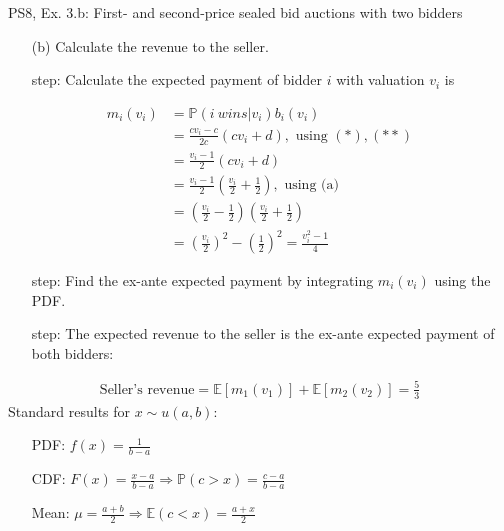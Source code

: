 \begin{frame}{PS8, Ex. 3.b: First- and second-price sealed bid auctions with two bidders}
    \begin{multicols}{2}
      \begin{itemize}
        \item[(b)] Calculate the revenue to the seller.
        \item[\nth{1} step:] Calculate the expected payment of bidder $i$ with valuation $v_i$ is
      \end{itemize}
      \vspace{-12pt}
      \begin{align*}
        m_i(v_i)&=\mathbb{P}(i\ wins|v_i)b_i(v_i)\\
                &=\frac{cv_i-c}{2c}(cv_i+d),\text{ using }(*),(**)\\
                &=\frac{v_i-1}{2}(cv_i+d)\\
                &=\frac{v_i-1}{2}\left(\frac{v_i}{2}+\frac{1}{2}\right),\text{ using (a)}\\
                &=\left(\frac{v_i}{2}-\frac{1}{2}\right)\left(\frac{v_i}{2}+\frac{1}{2}\right)\\
                &=\left(\frac{v_i}{2}\right)^2-\left(\frac{1}{2}\right)^2
                 =\frac{v_i^2-1}{4}
      \end{align*}
      \vspace{-18pt}
      \begin{itemize}
        \item[\nth{2} step:] Find the ex-ante expected payment by integrating $m_i(v_i)$ using the PDF.
        \item[\nth{3} step:] The expected revenue to the seller is the ex-ante expected payment of both bidders:
      \end{itemize}
      \vspace{-8pt}
      \begin{align*}
        \text{Seller's revenue}=\mathbb{E}[m_1(v_1)]+\mathbb{E}[m_2(v_2)]=\frac{5}{3}
      \end{align*}
      \vfill\null\columnbreak
      Standard results for $x\sim u(a, b):$
      \vspace{-6pt}
      \begin{enumerate}
        \item[PDF:] $f(x)=\frac{1}{b-a}$
        \item[CDF:] $F(x)=\frac{x-a}{b-a}\Rightarrow\mathbb{P}(c>x)=\frac{c-a}{b-a}$
        \item[Mean:] $\mu=\frac{a+b}{2}\Rightarrow\mathbb{E}(c<x)=\frac{a+x}{2}$

\end{enumerate}
\end{multicols}
\end{frame}
